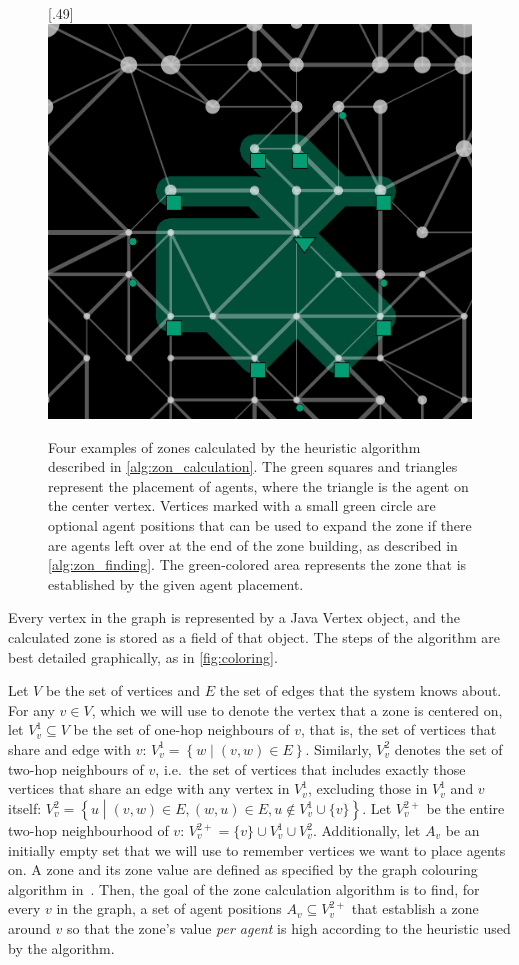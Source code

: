 \begin{figure}
  [.49\linewidth]{\includegraphics[width=.49\linewidth]{images/zone4.png}}
  \caption{Four examples of zones calculated by the heuristic algorithm described in \autoref{alg:zon_calculation}.
           The green squares and triangles represent the placement of agents, where the triangle is the agent on the center vertex.
           Vertices marked with a small green circle are optional agent positions that can be used to expand the zone if there are agents left over at the end of the zone building, as described in \autoref{alg:zon_finding}.
           The green-colored area represents the zone that is established by the given agent placement.}
  \label{fig:zones}
\end{figure}
Every vertex in the graph is represented by a Java Vertex object, and the calculated zone is stored as a field of that object.
The steps of the algorithm are best detailed graphically, as in \autoref{fig:coloring}.
\begin{definition}
  Let $V$ be the set of vertices and $E$ the set of edges that the system knows about.
  For any $v \in V$, which we will use to denote the vertex that a zone is centered on, let $V_v^1 \subseteq V$ be the set of one-hop neighbours of $v$, that is, the set of vertices that share and edge with $v$: $V_v^1= \left\{w \middle|\left(v,w \right ) \in E\right\}$.
  Similarly, $V_v^2$ denotes the set of two-hop neighbours of $v$, i.e.\ the set of vertices that includes exactly those vertices that share an edge with any vertex in $V_v^1$, excluding those in $V_v^1$ and $v$ itself: $V_v^2= \left\{u \middle|\left(v,w \right ) \in E, \left(w,u \right ) \in E, u \notin V_v^1\cup\{v\}\right\}$.
  Let $V_v^{2+}$ be the entire two-hop neighbourhood of $v$: $V_{v}^{2+} = \{v\} \cup V_v^1 \cup V_v^2$.
  Additionally, let $A_v$ be an initially empty set that we will use to remember vertices we want to place agents on.
  A zone and its zone value are defined as specified by the graph colouring algorithm in~\cite{ahlbrecht_mapc_2014}.
  Then, the goal of the zone calculation algorithm is to find, for every $v$ in the graph, a set of agent positions $A_v \subseteq V_{v}^{2+}$ that establish a zone around $v$ so that the zone's value \emph{per agent} is high according to the heuristic used by the algorithm.
\end{definition}
